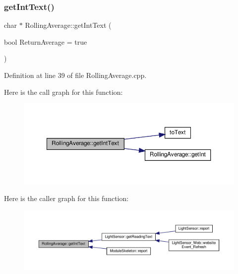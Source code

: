 \mbox{\label{class_rolling_average_a7b7015bd5a39e953983f73330b3d8c87}} 
\subsubsection{\texorpdfstring{get\+Int\+Text()}{getIntText()}\hspace{0.1cm}{\footnotesize\ttfamily [1/2]}}
{\footnotesize\ttfamily char $\ast$ Rolling\+Average\+::get\+Int\+Text (\begin{DoxyParamCaption}\item[{bool}]{Return\+Average = {\ttfamily true} }\end{DoxyParamCaption})}



Definition at line 39 of file Rolling\+Average.\+cpp.

Here is the call graph for this function\+:
\nopagebreak
\begin{figure}[H]
\begin{center}
\leavevmode
\includegraphics[width=350pt]{class_rolling_average_a7b7015bd5a39e953983f73330b3d8c87_cgraph}
\end{center}
\end{figure}
Here is the caller graph for this function\+:
\nopagebreak
\begin{figure}[H]
\begin{center}
\leavevmode
\includegraphics[width=350pt]{class_rolling_average_a7b7015bd5a39e953983f73330b3d8c87_icgraph}
\end{center}
\end{figure}
\mbox{\label{class_rolling_average_ac65c44e9f3900539e6305a3af6605de1}} 
